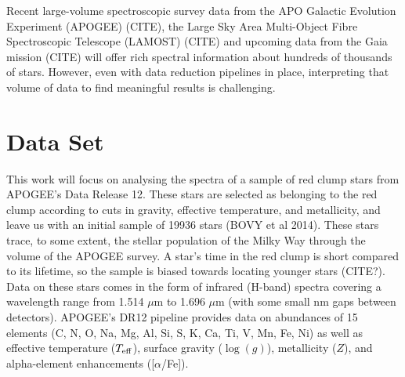 \documentclass[preprint]{aastex}
\begin{document}
Recent large-volume spectroscopic survey data from the APO Galactic Evolution Experiment (APOGEE) (CITE), the Large Sky Area Multi-Object Fibre Spectroscopic Telescope (LAMOST) (CITE) and upcoming data from the Gaia mission (CITE) will offer rich spectral information about hundreds of thousands of stars. However, even with data reduction pipelines in place, interpreting that volume of data to find meaningful results is challenging. 

 




\section{Data Set}
\label{sec:data}
This work will focus on analysing the spectra of a sample of red clump stars from APOGEE's Data Release 12. These stars are selected as belonging to the red clump according to cuts in gravity, effective temperature, and metallicity, and leave us with an initial sample of 19936 stars (BOVY et al 2014). These stars trace, to some extent, the stellar population of the Milky Way through the volume of the APOGEE survey. A star's time in the red clump is short compared to its lifetime, so the sample is biased towards locating younger stars (CITE?). Data on these stars comes in the form of infrared (H-band) spectra covering a wavelength range from 1.514 $\mu$m to 1.696 $\mu$m (with some small nm gaps between detectors). APOGEE's DR12 pipeline provides data on abundances of 15 elements (C, N, O, Na, Mg, Al, Si, S, K, Ca, Ti, V, Mn, Fe, Ni) as well as effective temperature ($T_{\rm eff}$), surface gravity ($\log(g)$), metallicity ($Z$), and alpha-element enhancements ([$\alpha$/Fe]).
\end{document}
